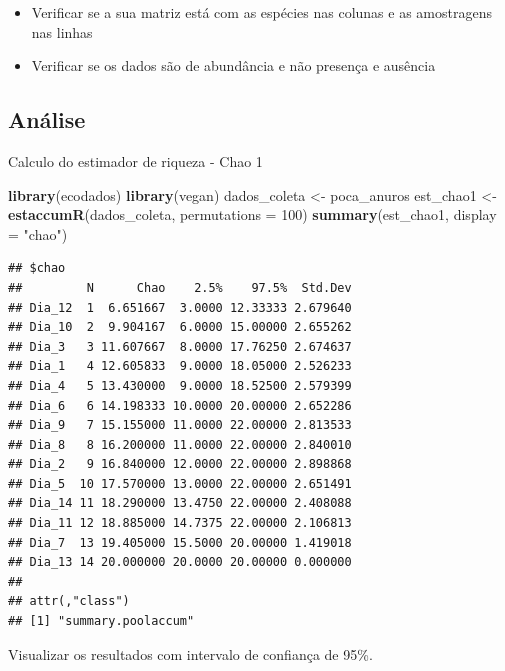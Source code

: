 \documentclass[
]{book}
\newenvironment{Shaded}{\begin{snugshade}}{\end{snugshade}}
\newcommand{\DataTypeTok}[1]{\textcolor[rgb]{0.13,0.29,0.53}{#1}}
\newcommand{\DecValTok}[1]{\textcolor[rgb]{0.00,0.00,0.81}{#1}}
\newcommand{\KeywordTok}[1]{\textcolor[rgb]{0.13,0.29,0.53}{\textbf{#1}}}
\newcommand{\NormalTok}[1]{#1}
\newcommand{\StringTok}[1]{\textcolor[rgb]{0.31,0.60,0.02}{#1}}
\providecommand{\tightlist}{%
  \setlength{\itemsep}{0pt}\setlength{\parskip}{0pt}}
\begin{document}
\begin{itemize}
\tightlist
\item
  Verificar se a sua matriz está com as espécies nas colunas e as amostragens nas linhas
\item
  Verificar se os dados são de abundância e não presença e ausência
\end{itemize}

\hypertarget{anuxe1lise-2}{%
\subsection{Análise}\label{anuxe1lise-2}}

Calculo do estimador de riqueza - Chao 1

\begin{Shaded}
\begin{Highlighting}[]
\KeywordTok{library}\NormalTok{(ecodados)}
\KeywordTok{library}\NormalTok{(vegan)}
\NormalTok{dados_coleta <-}\StringTok{ }\NormalTok{poca_anuros}
\NormalTok{est_chao1 <-}\StringTok{ }\KeywordTok{estaccumR}\NormalTok{(dados_coleta, }\DataTypeTok{permutations =} \DecValTok{100}\NormalTok{)}
\KeywordTok{summary}\NormalTok{(est_chao1, }\DataTypeTok{display =} \StringTok{"chao"}\NormalTok{)}
\end{Highlighting}
\end{Shaded}

\begin{verbatim}
## $chao
##         N      Chao    2.5%    97.5%  Std.Dev
## Dia_12  1  6.651667  3.0000 12.33333 2.679640
## Dia_10  2  9.904167  6.0000 15.00000 2.655262
## Dia_3   3 11.607667  8.0000 17.76250 2.674637
## Dia_1   4 12.605833  9.0000 18.05000 2.526233
## Dia_4   5 13.430000  9.0000 18.52500 2.579399
## Dia_6   6 14.198333 10.0000 20.00000 2.652286
## Dia_9   7 15.155000 11.0000 22.00000 2.813533
## Dia_8   8 16.200000 11.0000 22.00000 2.840010
## Dia_2   9 16.840000 12.0000 22.00000 2.898868
## Dia_5  10 17.570000 13.0000 22.00000 2.651491
## Dia_14 11 18.290000 13.4750 22.00000 2.408088
## Dia_11 12 18.885000 14.7375 22.00000 2.106813
## Dia_7  13 19.405000 15.5000 20.00000 1.419018
## Dia_13 14 20.000000 20.0000 20.00000 0.000000
## 
## attr(,"class")
## [1] "summary.poolaccum"
\end{verbatim}

Visualizar os resultados com intervalo de confiança de 95\%.
\end{document}
